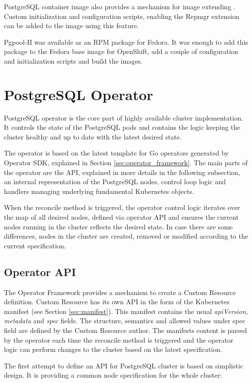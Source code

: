 \documentclass[
  digital, %
  twoside, %
  table,   %
  lof,     %
  lot,     %
]{fithesis3}
\begin{document}
PostgreSQL container image also provides a mechanism for image extending \cite{pg_cnt_extending}. Custom initialization and configuration scripts, enabling the Repmgr extension can be added to the image using this feature.

Pgpool-II was available as an RPM package for Fedora. It was enough to add this package to the Fedora base image for OpenShift, add a couple of configuration and initialization scripts and build the images.

\section{PostgreSQL Operator}
PostgreSQL operator is the core part of highly available cluster implementation. It controls the state of the PostgreSQL pods and contains the logic keeping the cluster healthy and up to date with the latest desired state.

The operator is based on the latest template for Go operators generated by Operator SDK, explained in Section \ref{sec:operator_framework}. The main parts of the operator are the API, explained in more details in the following subsection, an internal representation of the PostgreSQL nodes, control loop logic and handlers managing underlying fundamental Kubernetes objects.

When the reconcile method is triggered, the operator control logic iterates over the map of all desired nodes, defined via operator API and ensures the current nodes running in the cluster reflects the desired state. In case there are some differences, nodes in the cluster are created, removed or modified according to the current specification.

\subsection{Operator API} \label{sec:operator_api}
The Operator Framework provides a mechanism to create a Custom Resource definition. Custom Resource has its own API in the form of the Kubernetes manifest (see Section \ref{sec:manifest}). This manifest contains the usual \textit{apiVersion}, \textit{metadata} and \textit{spec} fields. The structure, semantics and allowed values under spec field are defined by the Custom Resource author. The manifests content is parsed by the operator each time the reconcile method is triggered and the operator logic can perform changes to the cluster based on the latest specification.

The first attempt to define an API for PostgreSQL cluster is based on simplistic design. It is providing a common node specification for the whole cluster:
\end{document}
